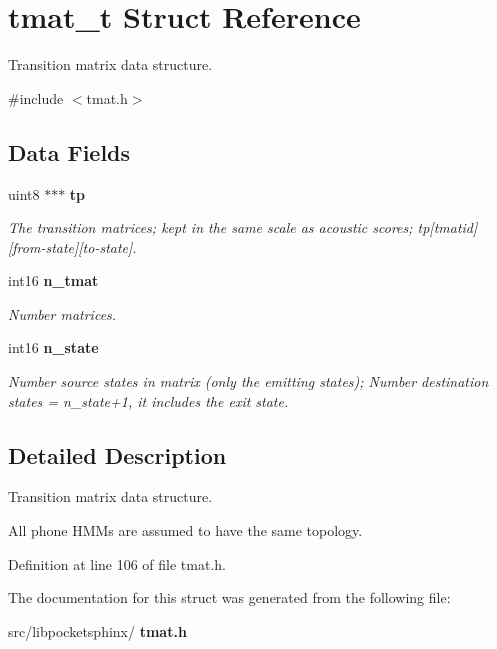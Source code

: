 \section{tmat\+\_\+t Struct Reference}
\label{structtmat__t}


Transition matrix data structure.  




{\ttfamily \#include $<$tmat.\+h$>$}

\subsection*{Data Fields}
\begin{DoxyCompactItemize}
\item 
\mbox{\label{structtmat__t_a9f518c96b30dab9efdb69bd779a7b5bf}} 
uint8 $\ast$$\ast$$\ast$ \textbf{ tp}
\begin{DoxyCompactList}\small\item\em The transition matrices; kept in the same scale as acoustic scores; tp[tmatid][from-\/state][to-\/state]. \end{DoxyCompactList}\item 
\mbox{\label{structtmat__t_ada644af34d54256f1574870d5f7a6788}} 
int16 \textbf{ n\+\_\+tmat}
\begin{DoxyCompactList}\small\item\em Number matrices. \end{DoxyCompactList}\item 
\mbox{\label{structtmat__t_a3633c71659e30cf23bee1f7efb4b4805}} 
int16 \textbf{ n\+\_\+state}
\begin{DoxyCompactList}\small\item\em Number source states in matrix (only the emitting states); Number destination states = n\+\_\+state+1, it includes the exit state. \end{DoxyCompactList}\end{DoxyCompactItemize}


\subsection{Detailed Description}
Transition matrix data structure. 

All phone H\+M\+Ms are assumed to have the same topology. 

Definition at line 106 of file tmat.\+h.



The documentation for this struct was generated from the following file\+:\begin{DoxyCompactItemize}
\item 
src/libpocketsphinx/\textbf{ tmat.\+h}\end{DoxyCompactItemize}
